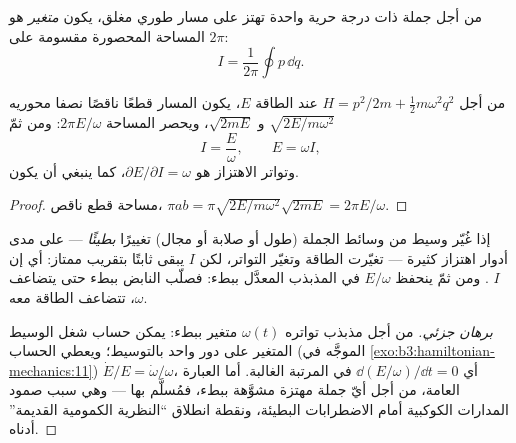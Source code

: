 \begin{definition}\label{def:b3:hamiltonian-mechanics:action-variable}
من أجل جملة ذات درجة حرية واحدة تهتز على مسار طوري مغلق، يكون
\emph{متغير } هو المساحة المحصورة مقسومة على
$2\pi$:
\[
I = \frac{1}{2\pi}\oint p\,\dd q .
\]
\end{definition}

\begin{proposition}\label{prop:b3:hamiltonian-mechanics:sho-action}
من أجل $H = p^2/2m + \tfrac12 m\omega^2q^2$ عند الطاقة $E$، يكون
المسار قطعًا ناقصًا نصفا محوريه $\sqrt{2E/m\omega^2}$ و $\sqrt{2mE}$،
ويحصر المساحة $2\pi E/\omega$: ومن ثمّ
\[
I = \frac{E}{\omega} , \qquad E = \omega I ,
\]
وتواتر الاهتزاز هو $\partial E/\partial I = \omega$، كما ينبغي أن
يكون.
\end{proposition}

\begin{proof}
مساحة قطع ناقص، $\pi ab = \pi\sqrt{2E/m\omega^2}\sqrt{2mE} =
2\pi E/\omega$.
\end{proof}

\begin{proposition}\label{prop:b3:hamiltonian-mechanics:adiabatic}
إذا غُيّر وسيط من وسائط الجملة (طول أو صلابة أو مجال) تغييرًا
\emph{بطيئًا} --- على مدى أدوار اهتزاز كثيرة --- تغيّرت الطاقة
وتغيّر التواتر، لكن  $I$ يبقى ثابتًا بتقريب ممتاز: أي إن
$I$ \emph{}. ومن ثمّ ينحفظ $E/\omega$ في المذبذب
المعدَّل ببطء: فصلّب النابض ببطء حتى يتضاعف $\omega$، تتضاعف
الطاقة معه.
\end{proposition}

\begin{proof}[برهان جزئي]
من أجل مذبذب تواتره $\omega(t)$ متغير ببطء: يمكن حساب شغل الوسيط
المتغير على دور واحد بالتوسيط؛ ويعطي الحساب (الموجَّه في
\cref{exo:b3:hamiltonian-mechanics:11})
$\dot E/E = \dot\omega/\omega$، أي $\dd(E/\omega)/\dd t = 0$
في المرتبة الغالبة. أما العبارة العامة، من أجل أيّ جملة مهتزة
مشوَّهة ببطء، فمُسلَّم بها --- وهي سبب صمود المدارات الكوكبية
أمام الاضطرابات البطيئة، ونقطة انطلاق ``النظرية الكمومية
القديمة'' أدناه.
\end{proof}

